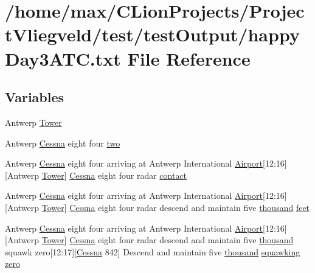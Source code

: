 \hypertarget{happyDay3ATC_8txt}{}\section{/home/max/\+C\+Lion\+Projects/\+Project\+Vliegveld/test/test\+Output/happy\+Day3\+A\+TC.txt File Reference}
\label{happyDay3ATC_8txt}
\subsection*{Variables}
\begin{DoxyCompactItemize}
\item 
Antwerp \hyperlink{happyDay3ATC_8txt_ace630024e4273db10ace0d1c52442b81}{Tower}
\item 
Antwerp \hyperlink{test_2testOutput_2log_8txt_a3de326468ae3f37941c91ae68853a1af}{Cessna} eight four \hyperlink{happyDay3ATC_8txt_a87da3704f93719801d287ba965c4f715}{two}
\item 
Antwerp \hyperlink{test_2testOutput_2log_8txt_a3de326468ae3f37941c91ae68853a1af}{Cessna} eight four arriving at Antwerp International \hyperlink{classAirport}{Airport}\mbox{[}12\+:16\mbox{]}\mbox{[}Antwerp \hyperlink{test_2testOutput_2log_8txt_ade5c2a9317c664c53d015e41bdc32393}{Tower}\mbox{]} \hyperlink{test_2testOutput_2log_8txt_a3de326468ae3f37941c91ae68853a1af}{Cessna} eight four radar \hyperlink{happyDay3ATC_8txt_aabccce409c3b74e74ea0c068d4a73f10}{contact}
\item 
Antwerp \hyperlink{test_2testOutput_2log_8txt_a3de326468ae3f37941c91ae68853a1af}{Cessna} eight four arriving at Antwerp International \hyperlink{classAirport}{Airport}\mbox{[}12\+:16\mbox{]}\mbox{[}Antwerp \hyperlink{test_2testOutput_2log_8txt_ade5c2a9317c664c53d015e41bdc32393}{Tower}\mbox{]} \hyperlink{test_2testOutput_2log_8txt_a3de326468ae3f37941c91ae68853a1af}{Cessna} eight four radar descend and maintain five \hyperlink{happyDay5ExpectedATC_8txt_a429913a0643fe14faca3dca538caa7bb}{thousand} \hyperlink{happyDay3ATC_8txt_adb5a296986a5b6019ec88f520f243c26}{feet}
\item 
Antwerp \hyperlink{test_2testOutput_2log_8txt_a3de326468ae3f37941c91ae68853a1af}{Cessna} eight four arriving at Antwerp International \hyperlink{classAirport}{Airport}\mbox{[}12\+:16\mbox{]}\mbox{[}Antwerp \hyperlink{test_2testOutput_2log_8txt_ade5c2a9317c664c53d015e41bdc32393}{Tower}\mbox{]} \hyperlink{test_2testOutput_2log_8txt_a3de326468ae3f37941c91ae68853a1af}{Cessna} eight four radar descend and maintain five \hyperlink{happyDay5ExpectedATC_8txt_a429913a0643fe14faca3dca538caa7bb}{thousand} squawk zero\mbox{[}12\+:17\mbox{]}\mbox{[}\hyperlink{test_2testOutput_2log_8txt_a3de326468ae3f37941c91ae68853a1af}{Cessna} 842\mbox{]} Descend and maintain five \hyperlink{happyDay5ExpectedATC_8txt_a429913a0643fe14faca3dca538caa7bb}{thousand} \hyperlink{test_2testOutput_2log_8txt_a890147ec88e2d9518adf949981616843}{squawking} \hyperlink{happyDay3ATC_8txt_adce466d7618784129bcb0feb6d2d98e4}{zero}

\end{DoxyCompactItemize}
